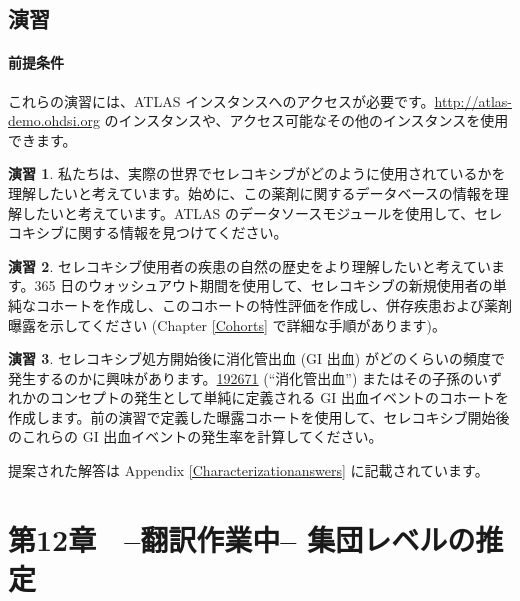 \documentclass[
  11pt]{book}
\theoremstyle{definition}
\theoremstyle{definition}
\theoremstyle{definition}
\newtheorem{exercise}{演習}[chapter]
\theoremstyle{definition}
\theoremstyle{remark}
\begin{document}
\section{演習}\label{ux6f14ux7fd2-4}

\subsubsection*{前提条件}\label{ux524dux63d0ux6761ux4ef6-6}

これらの演習には、ATLAS インスタンスへのアクセスが必要です。\url{http://atlas-demo.ohdsi.org} のインスタンスや、アクセス可能なその他のインスタンスを使用できます。

\begin{exercise}
\protect\hypertarget{exr:exerciseCharacterization1}{}\label{exr:exerciseCharacterization1}私たちは、実際の世界でセレコキシブがどのように使用されているかを理解したいと考えています。始めに、この薬剤に関するデータベースの情報を理解したいと考えています。ATLAS のデータソースモジュールを使用して、セレコキシブに関する情報を見つけてください。
\end{exercise}

\begin{exercise}
\protect\hypertarget{exr:exerciseCharacterization2}{}\label{exr:exerciseCharacterization2}セレコキシブ使用者の疾患の自然の歴史をより理解したいと考えています。365 日のウォッシュアウト期間を使用して、セレコキシブの新規使用者の単純なコホートを作成し、このコホートの特性評価を作成し、併存疾患および薬剤曝露を示してください (Chapter \ref{Cohorts} で詳細な手順があります)。
\end{exercise}

\begin{exercise}
\protect\hypertarget{exr:exerciseCharacterization3}{}\label{exr:exerciseCharacterization3}セレコキシブ処方開始後に消化管出血 (GI 出血) がどのくらいの頻度で発生するのかに興味があります。\href{http://athena.ohdsi.org/search-terms/terms/192671}{192671} (``消化管出血'') またはその子孫のいずれかのコンセプトの発生として単純に定義される GI 出血イベントのコホートを作成します。前の演習で定義した曝露コホートを使用して、セレコキシブ開始後のこれらの GI 出血イベントの発生率を計算してください。
\end{exercise}

提案された解答は Appendix \ref{Characterizationanswers} に記載されています。

\chapter{第12章　--翻訳作業中-- 集団レベルの推定}\label{PopulationLevelEstimation}
\end{document}

